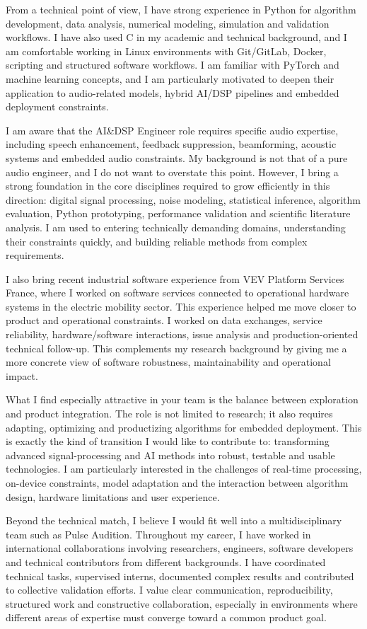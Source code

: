 \documentclass[11pt,a4paper]{altacv}
\begin{document}
{From a technical point of view, I have strong experience in Python for algorithm development, data analysis, numerical modeling, simulation and validation workflows. I have also used C in my academic and technical background, and I am comfortable working in Linux environments with Git/GitLab, Docker, scripting and structured software workflows. I am familiar with PyTorch and machine learning concepts, and I am particularly motivated to deepen their application to audio-related models, hybrid AI/DSP pipelines and embedded deployment constraints.

I am aware that the AI\&DSP Engineer role requires specific audio expertise, including speech enhancement, feedback suppression, beamforming, acoustic systems and embedded audio constraints. My background is not that of a pure audio engineer, and I do not want to overstate this point. However, I bring a strong foundation in the core disciplines required to grow efficiently in this direction: digital signal processing, noise modeling, statistical inference, algorithm evaluation, Python prototyping, performance validation and scientific literature analysis. I am used to entering technically demanding domains, understanding their constraints quickly, and building reliable methods from complex requirements.

I also bring recent industrial software experience from VEV Platform Services France, where I worked on software services connected to operational hardware systems in the electric mobility sector. This experience helped me move closer to product and operational constraints. I worked on data exchanges, service reliability, hardware/software interactions, issue analysis and production-oriented technical follow-up. This complements my research background by giving me a more concrete view of software robustness, maintainability and operational impact.

What I find especially attractive in your team is the balance between exploration and product integration. The role is not limited to research; it also requires adapting, optimizing and productizing algorithms for embedded deployment. This is exactly the kind of transition I would like to contribute to: transforming advanced signal-processing and AI methods into robust, testable and usable technologies. I am particularly interested in the challenges of real-time processing, on-device constraints, model adaptation and the interaction between algorithm design, hardware limitations and user experience.

Beyond the technical match, I believe I would fit well into a multidisciplinary team such as Pulse Audition. Throughout my career, I have worked in international collaborations involving researchers, engineers, software developers and technical contributors from different backgrounds. I have coordinated technical tasks, supervised interns, documented complex results and contributed to collective validation efforts. I value clear communication, reproducibility, structured work and constructive collaboration, especially in environments where different areas of expertise must converge toward a common product goal.

}
\end{document}
